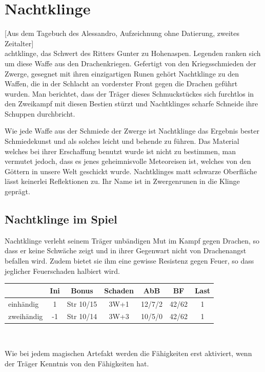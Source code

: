 \section{Nachtklinge}
\label{nachtklinge} [Aus dem Tagebuch des \mbox{Alessandro}, Aufzeichnung ohne Datierung, zweites Zeitalter]\\

achtklinge, das Schwert des Ritters
Gunter zu Hohenaspen. Legenden ranken sich um diese Waffe aus den Drachenkriegen. Gefertigt von den Kriegsschmieden
der Zwerge, gesegnet mit ihren einzigartigen Runen gehört Nachtklinge zu den Waffen, die in der Schlacht an vorderster Front gegen die
Drachen geführt wurden. Man berichtet, dass der Träger dieses Schmuckstückes sich furchtlos in den Zweikampf mit
diesen Bestien stürzt und Nachtklinges scharfe Schneide ihre Schuppen durchbricht.

\par Wie jede Waffe aus der Schmiede der Zwerge ist Nachtklinge das Ergebnis bester Schmiedekunst und als solches
leicht und behende zu führen. Das Material welches bei ihrer Erschaffung benutzt wurde ist nicht zu bestimmen, man
vermutet jedoch, dass es jenes geheimnisvolle Meteoreisen ist, welches von den Göttern in unsere Welt geschickt wurde.
Nachtklinges matt schwarze Oberfläche lässt keinerlei Reflektionen zu. Ihr Name ist in Zwergenrunen in die Klinge
geprägt.

\subsection*{Nachtklinge im Spiel}
\par Nachtklinge verleht seinem Träger unbändigen Mut im Kampf gegen Drachen, so dass er keine Schwäche zeigt und
in ihrer Gegenwart nicht von Drachenangst befallen wird. Zudem bietet sie ihm eine gewisse Resistenz gegen Feuer,
so dass jeglicher Feuerschaden halbiert wird.

\begin{tabular}{l|c|c|c|c|c|c}
           & Ini  & Bonus     & Schaden & AbB    & BF    & Last\\
\hline
einhändig  &  1   & Str 10/15 & 3W+1    & 12/7/2 & 42/62 & 1\\
zweihändig & -1   & Str 10/14 & 3W+3    & 10/5/0 & 42/62 & 1\\
\end{tabular}\\

\par Wie bei jedem magischen Artefakt werden die Fähigkeiten erst aktiviert, wenn der Träger Kenntnis von den
Fähigkeiten hat.